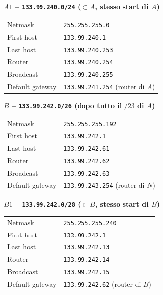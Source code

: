 \documentclass{report}
\begin{document}
\begin{solution}
\noindent\textbf{$A1$ -- \texttt{133.99.240.0/24} ($\subset A$, stesso start di $A$)}
\begin{center}
\begin{tabular}{ll}
\hline
Netmask & \texttt{255.255.255.0} \\
First host & \texttt{133.99.240.1} \\
Last host & \texttt{133.99.240.253} \\
Router & \texttt{133.99.240.254} \\
Broadcast & \texttt{133.99.240.255} \\
Default gateway & \texttt{133.99.241.254} (router di $A$) \\
\hline
\end{tabular}
\end{center}

\noindent\textbf{$B$ -- \texttt{133.99.242.0/26} \;(dopo tutto il $/23$ di $A$)}
\begin{center}
\begin{tabular}{ll}
\hline
Netmask & \texttt{255.255.255.192} \\
First host & \texttt{133.99.242.1} \\
Last host & \texttt{133.99.242.61} \\
Router & \texttt{133.99.242.62} \\
Broadcast & \texttt{133.99.242.63} \\
Default gateway & \texttt{133.99.243.254} (router di $N$) \\
\hline
\end{tabular}
\end{center}

\noindent\textbf{$B1$ -- \texttt{133.99.242.0/28} ($\subset B$, stesso start di $B$)}
\begin{center}
\begin{tabular}{ll}
\hline
Netmask & \texttt{255.255.255.240} \\
First host & \texttt{133.99.242.1} \\
Last host & \texttt{133.99.242.13} \\
Router & \texttt{133.99.242.14} \\
Broadcast & \texttt{133.99.242.15} \\
Default gateway & \texttt{133.99.242.62} (router di $B$) \\
\hline
\end{tabular}
\end{center}


\end{solution}
\end{document}
